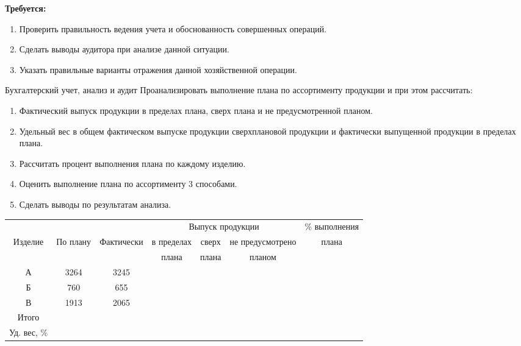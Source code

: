 \documentclass[
	11pt,
	a4paper,
	]
	{article}
\begin{document}
	\textbf{Требуется:}
	\begin{enumerate}
		\item Проверить правильность ведения учета и обоснованность совершенных операций. 

		\item Сделать выводы аудитора при анализе данной ситуации.

		\item Указать правильные варианты отражения данной хозяйственной операции.
	\end{enumerate}

\begin{center}\lowGE * \end{center}
\newpage





 {Бухгалтерский учет, анализ и аудит}
\prGE
	Проанализировать выполнение плана по ассортименту продукции и при этом рассчитать: 

	\begin{enumerate}
		\item Фактический выпуск продукции в пределах плана, сверх плана и не предусмотренной планом.

		\item Удельный вес в общем фактическом выпуске продукции сверхплановой продукции и фактически выпущенной продукции в пределах плана.

		\item Рассчитать процент выполнения плана по каждому изделию.

		\item Оценить выполнение плана по ассортименту 3 способами.

		\item Сделать выводы по результатам анализа.
	\end{enumerate}

\begin{table}[ht!]\centering
	\begin{tabular}{|c|c|c |c|c|c| c|} 
		\hline
		&&& \multicolumn{3}{c|}{Выпуск продукции} &
		\% выполнения 
		\\ \cline{4-6}
		Изделие & По плану & Фактически & 	в пределах & 	сверх & 	не предусмотрено & плана
		\\
		& & & плана & плана & планом & 
		\\ \hline
		А & 3264 & 3245 & & & & \\ \hline
		Б & 760 & 655 & & & & \\ \hline
		В & 1913 & 2065 & & & & \\ \hline
		Итого & & & & & & \\ \hline
		Уд. вес, \%  & & & & & & 
		\\ \hline
	\end{tabular}
\end{table}
\end{document}
